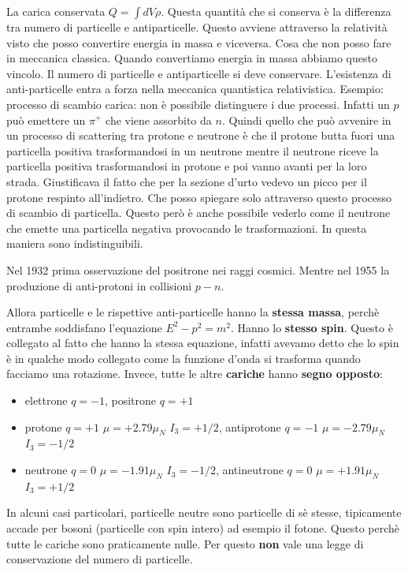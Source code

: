 La carica conservata $Q=\int dV\rho$. Questa quantità che si conserva è la differenza tra numero di particelle e antiparticelle. Questo avviene attraverso la relatività visto che posso convertire energia in massa e viceversa. Cosa che non posso fare in meccanica classica. Quando convertiamo energia in massa abbiamo questo vincolo. Il numero di particelle e antiparticelle si deve conservare. L'esistenza di anti-particelle entra a forza nella meccanica quantistica relativistica. Esempio: processo di scambio carica: non è possibile distinguere i due processi. Infatti un $p$ può emettere un $\pi^+$ che viene assorbito da $n$. Quindi quello che può avvenire in un processo di scattering tra protone e neutrone è che il protone butta fuori una particella positiva trasformandosi in un neutrone mentre il neutrone riceve la particella positiva trasformandosi in protone e poi vanno avanti per la loro strada. Giustificava il fatto che per la sezione d'urto vedevo un picco per il protone respinto all'indietro. Che posso spiegare solo attraverso questo processo di scambio di particella. Questo però è anche possibile vederlo come il neutrone che emette una particella negativa provocando le trasformazioni. In questa maniera sono indistinguibili.

Nel 1932 prima osservazione del positrone nei raggi cosmici. Mentre nel 1955 la produzione di anti-protoni in collisioni $p-n$.

Allora particelle e le rispettive anti-particelle hanno la \textbf{stessa massa}, perchè entrambe soddisfano l'equazione $E^2-p^2=m^2$. Hanno lo \textbf{stesso spin}. Questo è collegato al fatto che hanno la stessa equazione, infatti avevamo detto che lo spin è in qualche modo collegato come la funzione d'onda si trasforma quando facciamo una rotazione. Invece, tutte le altre \textbf{cariche} hanno \textbf{segno opposto}:
\begin{itemize}
    \item elettrone $q=-1$, positrone $q=+1$
    \item protone $q=+1$ $\mu=+2.79\mu_N$ $I_3=+1/2$, antiprotone $q=-1$ $\mu=-2.79\mu_N$ $I_3=-1/2$
    \item neutrone $q=0$ $\mu=-1.91\mu_N$ $I_3=-1/2$, antineutrone $q=0$ $\mu=+1.91\mu_N$ $I_3=+1/2$
\end{itemize}
In alcuni casi particolari, particelle neutre sono particelle di sè stesse, tipicamente accade per bosoni (particelle con spin intero) ad esempio il fotone. Questo perchè tutte le cariche sono praticamente nulle. Per questo \textbf{non} vale una legge di conservazione del numero di particelle. 

